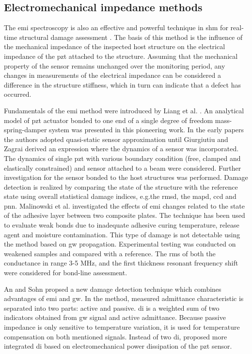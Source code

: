 \subsection{Electromechanical impedance methods}
The \ac{emi} spectroscopy is also an effective and powerful technique in \ac{shm} for real-time structural damage assessment \cite{park2003overview}.
The basis of this method is the influence of the mechanical impedance of the inspected host structure on the electrical impedance of the \ac{pzt} attached to the structure.
Assuming that the mechanical property of the sensor remains unchanged over the monitoring period, any changes in measurements of the electrical impedance can be considered a difference in the structure stiffness, which in turn can indicate that a defect has occurred.

Fundamentals of the \ac{emi} method were introduced by Liang et al. \cite{liang1994impedance}.
An analytical model of \ac{pzt} actuator bonded to one end of a single degree of freedom mass-spring-damper system was presented in this pioneering work.
In the early papers the authors adopted quasi-static sensor approximation until  Giurgiutiu and Zagrai \cite{giurgiutiu2000characterization} derived an expression where the dynamics of a sensor was incorporated.
The dynamics of single \ac{pzt} with various boundary condition (free, clamped and elastically constrained) and sensor attached to a beam were considered.
Further investigation \cite{zagrai2001electro, giurgiutiu2005damage} for the sensor bonded to the host structures was performed.
Damage detection is realized by comparing the state of the structure with the reference state using overall statistical damage indices, e.g.the \ac{rmsd}, the \ac{mapd}, \ac{ccd} and \ac{pnn}.
Malinowski et al. \cite{malinowski2014characterisation, malinowski2015use} investigated the effects of \ac{emi} changes related to the state of the adhesive layer between two composite plates.
The technique has been used to evaluate weak bonds due to inadequate adhesive curing temperature, release agent and moisture contamination. This type of damage is not detectable using the method based on \ac{gw} propagation.
Experimental testing was conducted on weakened samples and compared with a reference.
The \ac{rms} of both the conductance in range 3-5 MHz, and the first thickness resonant frequency shift were considered for bond-line assessment.

An and Sohn \cite{an2012integrated} propsed a new damage detection technique which combines advantages of \ac{emi} and \ac{gw}.
In the method, measured admittance characteristic is separated into two parts: active and passive.
\Ac{di} is a weighted sum of two indicators obtained from \ac{gw} signal and active admittance.
Because passive impedance is only sensitive to temperature variation, it is used for temperature compensation on both mentioned signals.
Instead of two \ac{di}, \cite{sevillano2016damage} proposed more integrated \ac{di} based on electromechanical power dissipation of the \ac{pzt} sensor.

